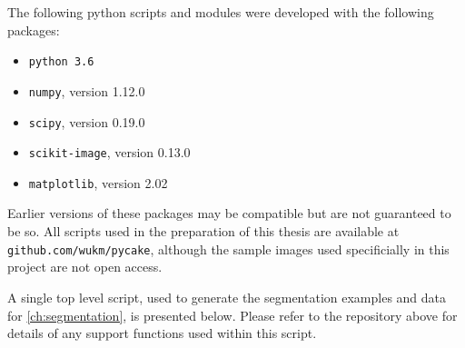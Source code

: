 The following python scripts and modules were developed with the following packages:

\begin{itemize}
\item \texttt{python 3.6}
\item \texttt{numpy}, version 1.12.0
\item \texttt{scipy}, version 0.19.0
\item \texttt{scikit-image}, version 0.13.0 
\item \texttt{matplotlib}, version 2.02
\end{itemize}
%
Earlier versions of these packages may be compatible but are not guaranteed to be so. 
All scripts used in the preparation of this thesis are available at
\texttt{github.com/wukm/pycake}, although the sample images used specificially in this project are
not open access.

A single top level script, used to generate the segmentation examples and data for \cref{ch:segmentation}, is presented below. Please refer to the repository above for details of any support functions used within this script.



